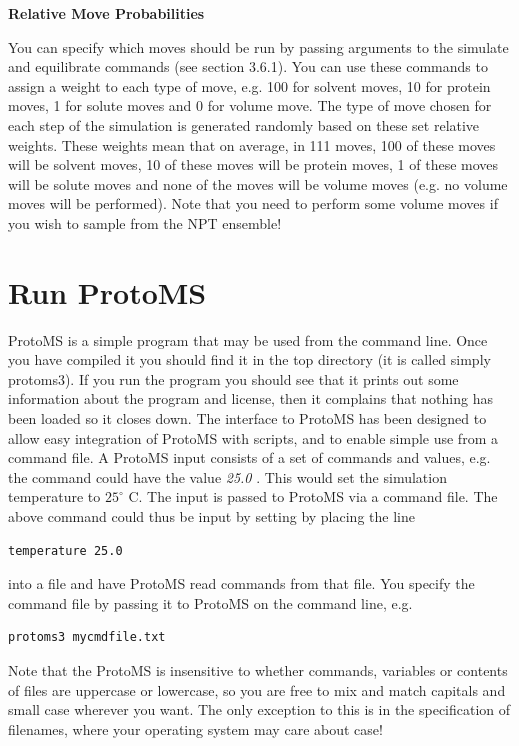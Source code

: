 \documentclass[letterpaper,10pt,english]{sphinxmanual}
\begin{document}
\textbf{Relative Move Probabilities}

You can specify which moves should be run by passing arguments to the simulate and equilibrate commands (see section 3.6.1). You can use these commands to assign a weight to each type of move, e.g. 100 for solvent moves, 10 for protein moves, 1 for solute moves and 0 for volume move. The type of move chosen for each step of the simulation is generated randomly based on these set relative weights. These weights mean that on average, in 111 moves, 100 of these moves will be solvent moves, 10 of these moves will be protein moves, 1 of these moves will be solute moves and none of the moves will be volume moves (e.g. no volume moves will be performed). Note that you need to perform some volume moves if you wish to sample from the NPT ensemble!


\chapter{Run ProtoMS}
\label{protoms:run-protoms}
ProtoMS is a simple program that may be used from the command line. Once you have compiled it you should find it in the top directory (it is called simply protoms3). If you run the program you should see that it prints out some information about the program and license, then it complains that nothing has been loaded so it closes down. The interface to ProtoMS has been designed to allow easy integration of ProtoMS with scripts, and to enable simple use from a command file. A ProtoMS input consists of a set of commands and values, e.g. the command  could have the value \emph{25.0} . This would set the simulation temperature to \(25^\circ\) C. The input is passed to ProtoMS via a command file. The above command could thus be input by setting by placing the line

\begin{Verbatim}[commandchars=\\\{\}]
temperature 25.0
\end{Verbatim}

into a file and have ProtoMS read commands from that file. You specify the command file by passing it to ProtoMS on the command line, e.g.

\begin{Verbatim}[commandchars=\\\{\}]
protoms3 mycmdfile.txt
\end{Verbatim}

Note that the ProtoMS is insensitive to whether commands, variables or contents of files are uppercase or lowercase, so you are free to mix and match capitals and small case wherever you want. The only exception to this is in the specification of filenames, where your operating system may care about case!
\end{document}
